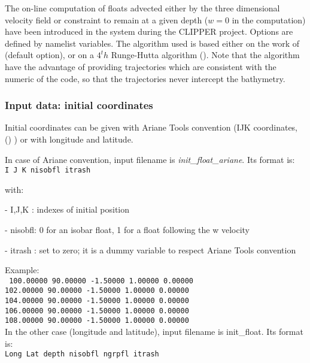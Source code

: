 \documentclass[../main/NEMO_manual]{subfiles}
\begin{document}
The on-line computation of floats advected either by the three dimensional velocity field or constraint to
remain at a given depth ($w = 0$ in the computation) have been introduced in the system during the CLIPPER project.
Options are defined by  namelist variables.
The algorithm used is based either on the work of \cite{blanke.raynaud_JPO97} (default option),
or on a $4^th$ Runge-Hutta algorithm ().
Note that the \cite{blanke.raynaud_JPO97} algorithm have the advantage of providing trajectories which
are consistent with the numeric of the code, so that the trajectories never intercept the bathymetry.

\subsubsection{Input data: initial coordinates}

Initial coordinates can be given with Ariane Tools convention
(IJK coordinates, () ) or with longitude and latitude.

In case of Ariane convention, input filename is \textit{init\_float\_ariane}.
Its format is: \\
{ \texttt{I J K nisobfl itrash}}

\noindent with:

 - I,J,K  : indexes of initial position

 - nisobfl: 0 for an isobar float, 1 for a float following the w velocity

 - itrash : set to zero; it is a dummy variable to respect Ariane Tools convention

\noindent Example: \\
\noindent
{
  \texttt{
    100.00000  90.00000  -1.50000 1.00000   0.00000   \\
    102.00000  90.00000  -1.50000 1.00000   0.00000   \\
    104.00000  90.00000  -1.50000 1.00000   0.00000   \\
    106.00000  90.00000  -1.50000 1.00000   0.00000   \\
    108.00000  90.00000  -1.50000 1.00000   0.00000}
} \\

In the other case (longitude and latitude), input filename is init\_float.
Its format is: \\
{ \texttt{Long Lat depth nisobfl ngrpfl itrash}}
\end{document}
